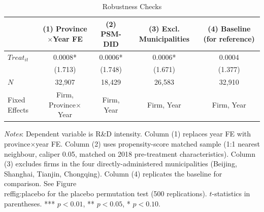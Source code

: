 \begin{table}[htbp]
\centering
\caption{Robustness Checks}
\label{tab:robust}
\begin{threeparttable}
\begin{tabular}{lcccc}
\toprule
 & (1) Province$\times$Year FE & (2) PSM-DID & (3) Excl. Municipalities & (4) Baseline (for reference) \\
\midrule
$Treat_{it}$ & 0.0008* & 0.0006* & 0.0006* & 0.0004 \\
 & (1.713) & (1.748) & (1.671) & (1.377) \\
\midrule
$N$ & 32,907 & 18,429 & 26,583 & 32,910 \\
Fixed Effects & Firm, Province$\times$Year & Firm, Year & Firm, Year & Firm, Year \\
\bottomrule
\end{tabular}
\begin{tablenotes}
\small
\item \textit{Notes}: Dependent variable is R\&D intensity. Column (1) replaces year FE with province$\times$year FE. Column (2) uses propensity-score matched sample (1:1 nearest neighbour, caliper 0.05, matched on 2018 pre-treatment characteristics). Column (3) excludes firms in the four directly-administered municipalities (Beijing, Shanghai, Tianjin, Chongqing). Column (4) replicates the baseline for comparison. See Figure~\\ref{fig:placebo} for the placebo permutation test (500 replications). $t$-statistics in parentheses. *** $p<0.01$, ** $p<0.05$, * $p<0.10$.
\end{tablenotes}
\end{threeparttable}
\end{table}